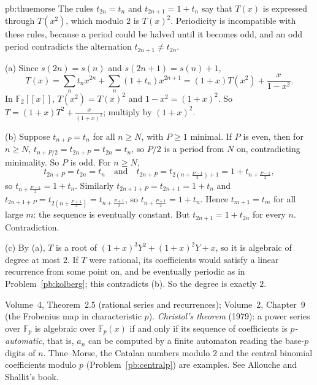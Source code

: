 \begin{solution}{pb:thuemorse}
\idea The rules $t_{2n}=t_n$ and $t_{2n+1}=1+t_n$ say that $T(x)$ is expressed through $T(x^2)$, which modulo $2$ is $T(x)^2$. Periodicity
is incompatible with these rules, because a period could be halved until it becomes odd, and an odd period contradicts the
alternation $t_{2n+1}\ne t_{2n}$.

\writeup (a) Since $s(2n)=s(n)$ and $s(2n+1)=s(n)+1$,
\[
T(x)=\sum_nt_nx^{2n}+\sum_n(1+t_n)x^{2n+1}=(1+x)T(x^2)+\frac x{1-x^2}.
\]
In $\mathbb F_2[[x]]$, $T(x^2)=T(x)^2$ and $1-x^2=(1+x)^2$. So $T=(1+x)T^2+\frac x{(1+x)^2}$; multiply by $(1+x)^2$.

(b) Suppose $t_{n+P}=t_n$ for all $n\ge N$, with $P\ge1$ minimal. If $P$ is even, then for $n\ge N$, $t_{n+P/2}=t_{2n+P}=t_{2n}=t_n$, so $P/2$ is a
period from $N$ on, contradicting minimality. So $P$ is odd. For $n\ge N$,
\[
t_{2n+P}=t_{2n}=t_n\quad\text{and}\quad t_{2n+P}=t_{2(n+\frac{P-1}2)+1}=1+t_{n+\frac{P-1}2},
\]
so $t_{n+\frac{P-1}2}=1+t_n$. Similarly $t_{2n+1+P}=t_{2n+1}=1+t_n$ and $t_{2n+1+P}=t_{2(n+\frac{P+1}2)}=t_{n+\frac{P+1}2}$, so $t_{n+\frac{P+1}2}=1+t_n$.
Hence $t_{m+1}=t_m$ for all large $m$: the sequence is eventually constant. But $t_{2n+1}=1+t_{2n}$ for every $n$. Contradiction.

(c) By (a), $T$ is a root of $(1+x)^3Y^2+(1+x)^2Y+x$, so it is algebraic of degree at most $2$. If $T$ were rational, its coefficients
would satisfy a linear recurrence from some point on, and be eventually periodic as in Problem~\ref{pb:kolberg}; this contradicts
(b). So the degree is exactly $2$.

\tools Volume~4, Theorem~2.5 (rational series and recurrences); Volume~2, Chapter~9 (the Frobenius map in characteristic $p$).
\leads \emph{Christol's theorem} (1979): a power series over $\mathbb F_p$ is algebraic over $\mathbb F_p(x)$ if and only if its sequence
of coefficients is \emph{$p$-automatic}, that is, $a_n$ can be computed by a finite automaton reading the base-$p$ digits of $n$. Thue--Morse,
the Catalan numbers modulo $2$ and the central binomial coefficients modulo $p$ (Problem~\ref{pb:centralp}) are examples. See
Allouche and Shallit's book.
\end{solution}

